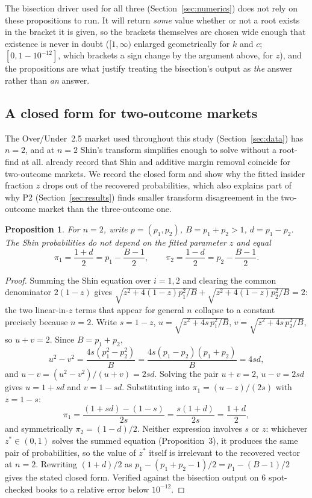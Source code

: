 \documentclass[11pt,a4paper]{article}
\newtheorem{proposition}{Proposition}
\begin{document}
The bisection driver used for all three (Section~\ref{sec:numerics}) does not
rely on these propositions to run. It will return \emph{some} value
whether or not a root exists in the bracket it is given, so the brackets
themselves are chosen wide enough that existence is never in doubt
($[1, \infty)$ enlarged geometrically for $k$ and $c$; $[0, 1-10^{-12}]$,
which brackets a sign change by the argument above, for $z$), and the
propositions are what justify treating the bisection's output as \emph{the}
answer rather than \emph{an} answer.

\subsection{A closed form for two-outcome markets}
\label{sec:twooutcome}

The Over/Under~2.5 market used throughout this study (Section~\ref{sec:data})
has $n = 2$, and at $n=2$ Shin's transform simplifies enough to solve without
a root-find at all. \citet{clarke2017} already record that Shin and additive
margin removal coincide for two-outcome markets. We record the closed form
and show why the fitted insider fraction $z$ drops out of the recovered
probabilities, which also explains part of why P2
(Section~\ref{sec:results}) finds smaller transform disagreement in the
two-outcome market than the three-outcome one.

\begin{proposition}
For $n = 2$, write $p = (p_1, p_2)$, $B = p_1 + p_2 > 1$, $d = p_1 - p_2$.
The Shin probabilities do not depend on the fitted parameter $z$ and equal
\begin{equation}
  \pi_1 = \frac{1+d}{2} = p_1 - \frac{B-1}{2}, \qquad
  \pi_2 = \frac{1-d}{2} = p_2 - \frac{B-1}{2}.
\end{equation}
\end{proposition}
\begin{proof}
Summing the Shin equation over $i=1,2$ and clearing the common denominator
$2(1-z)$ gives
$\sqrt{z^2+4(1-z)p_1^2/B} + \sqrt{z^2+4(1-z)p_2^2/B} = 2$: the two linear-in-$z$
terms that appear for general $n$ collapse to a constant precisely because
$n = 2$. Write $s = 1-z$, $u = \sqrt{z^2+4s\,p_1^2/B}$, $v =
\sqrt{z^2+4s\,p_2^2/B}$, so $u + v = 2$. Since $B = p_1+p_2$,
\[
  u^2 - v^2 = \frac{4s(p_1^2-p_2^2)}{B} = \frac{4s(p_1-p_2)(p_1+p_2)}{B} = 4sd,
\]
and $u - v = (u^2-v^2)/(u+v) = 2sd$. Solving the pair $u+v=2$, $u-v=2sd$
gives $u = 1+sd$ and $v = 1-sd$. Substituting into
$\pi_1 = (u-z)/(2s)$ with $z = 1-s$:
\[
  \pi_1 = \frac{(1+sd) - (1-s)}{2s} = \frac{s(1+d)}{2s} = \frac{1+d}{2},
\]
and symmetrically $\pi_2 = (1-d)/2$. Neither expression involves $s$ or $z$:
whichever $z^\ast \in (0,1)$ solves the summed equation (Proposition~3), it
produces the same pair of probabilities, so the value of $z^\ast$ itself is
irrelevant to the recovered vector at $n=2$. Rewriting $(1+d)/2$ as $p_1 -
(p_1+p_2-1)/2 = p_1 - (B-1)/2$ gives the stated closed form. Verified against
the bisection output on 6 spot-checked books to a relative error below
$10^{-12}$.
\end{proof}
\end{document}
